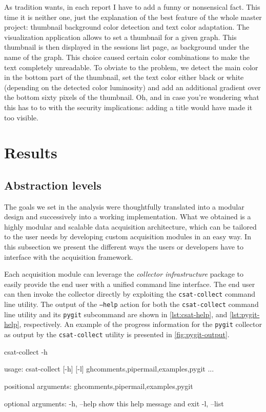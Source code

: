 As tradition wants, in each report I have to add a funny or nonsensical fact. This time it is neither one, just the explanation of the best feature of the whole master project: thumbnail background color detection and text color adaptation. The visualization application allows to set a thumbnail for a given graph. This thumbnail is then displayed in the sessions list page, as background under the name of the graph. This choice caused certain color combinations to make the text completely unreadable. To obviate to the problem, we detect the main color in the bottom part of the thumbnail, set the text color either black or white (depending on the detected color luminosity) and add an additional gradient over the bottom sixty pixels of the thumbnail. Oh, and in case you're wondering what this has to to with the security implications: adding a title would have made it too visible.

\section{Results}

\subsection{Abstraction levels}

The goals we set in the analysis were thoughtfully translated into a modular design and successively into a working implementation. What we obtained is a highly modular and scalable data acquisition architecture, which can be tailored to the user needs by developing custom acquisition modules in an easy way. In this subsection we present the different ways the users or developers have to interface with the acquisition framework.

Each acquisition module can leverage the \emph{collector infrastructure} package to easily provide the end user with a unified command line interface. The end user can then invoke the collector directly by exploiting the \texttt{csat-collect} command line utility. The output of the \texttt{--help} action for both the \texttt{csat-collect} command line utility and its \texttt{pygit} subcommand are shown in \vref{lst:csat-help}, and \vref{lst:pygit-help}, respectively. An example of the progress information for the \texttt{pygit} collector as output by the \texttt{csat-collect} utility is presented in \ref{fig:pygit-output}.

\begin{userprompt}[caption={General help for the \texttt{csat-collect} command line utility.},label=lst:csat-help]
csat-collect -h
\end{userprompt}
\begin{cmdresult}
usage: csat-collect [-h] [-l] {ghcomments,pipermail,examples,pygit} ...

positional arguments:
  {ghcomments,pipermail,examples,pygit}

optional arguments:
  -h, --help            show this help message and exit
  -l, --list
\end{cmdresult}


